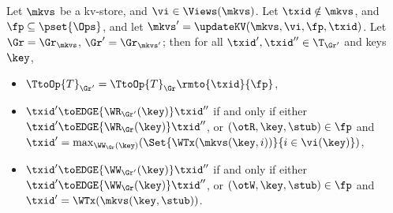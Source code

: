 \begin{lemma}
\label{lem:graph.update}
Let $\mkvs$ be a kv-store, and $\vi \in \Views(\mkvs)$. Let $\txid \notin \mkvs$, and 
$\fp \subseteq \pset{\Ops}$, and let $\mkvs' = \updateKV(\mkvs, \vi, \fp, \txid)$. 
Let $\Gr = \Gr_{\mkvs}$, $\Gr' = \Gr_{\mkvs'}$; then for all $\txid', \txid'' \in \T_{\Gr'}$ and keys $\key$, 
\begin{itemize}
\item $\TtoOp{T}_{\Gr'} = \TtoOp{T}_{\Gr}\rmto{\txid}{\fp}$, 
\item $\txid' \toEDGE{\WR_{\Gr'}(\key)} \txid''$ if and only if either 
$\txid' \toEDGE{\WR_{\Gr}(\key)} \txid''$, or $(\otR, \key, \stub) \in \fp$ and 
$\txid' = \max_{\WW_{\Gr}(\key)}(\Set{\WTx(\mkvs(\key, i)) }{ i \in \vi(\key)})$, 
\item $\txid' \toEDGE{\WW_{\Gr'}(\key)} \txid''$ if and only if either 
$\txid' \toEDGE{\WW_{\Gr}(\key)} \txid''$, or $(\otW, \key, \stub) \in \fp$ 
and $\txid' = \WTx(\mkvs(\key, \stub))$. 
\end{itemize}
\end{lemma}

